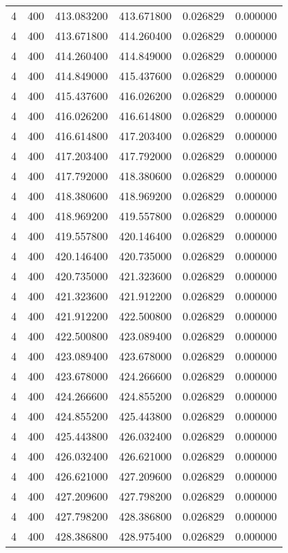 \begin{longtable}{rrrrrr}
4 & 400 & 413.083200 & 413.671800 & 0.026829 & 0.000000 \\
4 & 400 & 413.671800 & 414.260400 & 0.026829 & 0.000000 \\
4 & 400 & 414.260400 & 414.849000 & 0.026829 & 0.000000 \\
4 & 400 & 414.849000 & 415.437600 & 0.026829 & 0.000000 \\
4 & 400 & 415.437600 & 416.026200 & 0.026829 & 0.000000 \\
4 & 400 & 416.026200 & 416.614800 & 0.026829 & 0.000000 \\
4 & 400 & 416.614800 & 417.203400 & 0.026829 & 0.000000 \\
4 & 400 & 417.203400 & 417.792000 & 0.026829 & 0.000000 \\
4 & 400 & 417.792000 & 418.380600 & 0.026829 & 0.000000 \\
4 & 400 & 418.380600 & 418.969200 & 0.026829 & 0.000000 \\
4 & 400 & 418.969200 & 419.557800 & 0.026829 & 0.000000 \\
4 & 400 & 419.557800 & 420.146400 & 0.026829 & 0.000000 \\
4 & 400 & 420.146400 & 420.735000 & 0.026829 & 0.000000 \\
4 & 400 & 420.735000 & 421.323600 & 0.026829 & 0.000000 \\
4 & 400 & 421.323600 & 421.912200 & 0.026829 & 0.000000 \\
4 & 400 & 421.912200 & 422.500800 & 0.026829 & 0.000000 \\
4 & 400 & 422.500800 & 423.089400 & 0.026829 & 0.000000 \\
4 & 400 & 423.089400 & 423.678000 & 0.026829 & 0.000000 \\
4 & 400 & 423.678000 & 424.266600 & 0.026829 & 0.000000 \\
4 & 400 & 424.266600 & 424.855200 & 0.026829 & 0.000000 \\
4 & 400 & 424.855200 & 425.443800 & 0.026829 & 0.000000 \\
4 & 400 & 425.443800 & 426.032400 & 0.026829 & 0.000000 \\
4 & 400 & 426.032400 & 426.621000 & 0.026829 & 0.000000 \\
4 & 400 & 426.621000 & 427.209600 & 0.026829 & 0.000000 \\
4 & 400 & 427.209600 & 427.798200 & 0.026829 & 0.000000 \\
4 & 400 & 427.798200 & 428.386800 & 0.026829 & 0.000000 \\
4 & 400 & 428.386800 & 428.975400 & 0.026829 & 0.000000 \\

\end{longtable}
